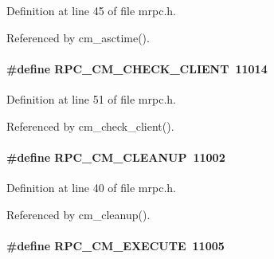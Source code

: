 \begin{DoxyItemize}
\item 
\end{DoxyItemize}

Definition at line 45 of file mrpc.h.

Referenced by cm\_\-asctime().
\paragraph[{RPC\_\-CM\_\-CHECK\_\-CLIENT}]{\setlength{\rightskip}{0pt plus 5cm}\#define RPC\_\-CM\_\-CHECK\_\-CLIENT~11014}\hfill\label{group__mrpcdefineh_ga15efc37e61154a6f4f4e52e852b8d858}

\begin{DoxyItemize}
\item 
\end{DoxyItemize}

Definition at line 51 of file mrpc.h.

Referenced by cm\_\-check\_\-client().
\paragraph[{RPC\_\-CM\_\-CLEANUP}]{\setlength{\rightskip}{0pt plus 5cm}\#define RPC\_\-CM\_\-CLEANUP~11002}\hfill\label{group__mrpcdefineh_gaeddbbd744c03a8990102d06e4b525d4c}

\begin{DoxyItemize}
\item 
\end{DoxyItemize}

Definition at line 40 of file mrpc.h.

Referenced by cm\_\-cleanup().
\paragraph[{RPC\_\-CM\_\-EXECUTE}]{\setlength{\rightskip}{0pt plus 5cm}\#define RPC\_\-CM\_\-EXECUTE~11005}\hfill\label{group__mrpcdefineh_gae75588700fd5b48de1640563e74ae4c5}

\begin{DoxyItemize}
\item 
\end{DoxyItemize}

